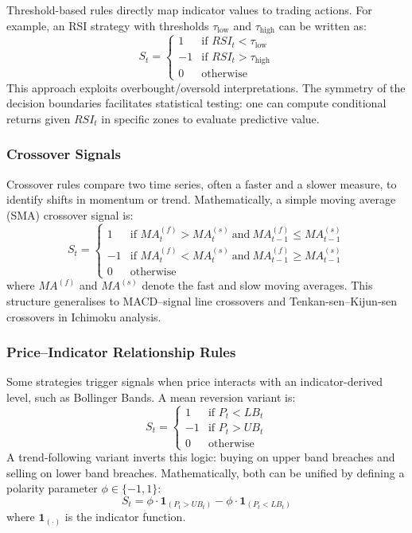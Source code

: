 Threshold-based rules directly map indicator values to trading actions. For example, an RSI strategy with thresholds $\tau_{\text{low}}$ and $\tau_{\text{high}}$ can be written as:
\[
S_t =
\begin{cases}
1 & \text{if } RSI_t < \tau_{\text{low}} \\
-1 & \text{if } RSI_t > \tau_{\text{high}} \\
0 & \text{otherwise}
\end{cases}
\]
This approach exploits overbought/oversold interpretations. The symmetry of the decision boundaries facilitates statistical testing: one can compute conditional returns given $RSI_t$ in specific zones to evaluate predictive value.

\subsubsection{Crossover Signals}

Crossover rules compare two time series, often a faster and a slower measure, to identify shifts in momentum or trend. Mathematically, a simple moving average (SMA) crossover signal is:
\[
S_t =
\begin{cases}
1 & \text{if } MA^{(f)}_t > MA^{(s)}_t \ \text{and} \ MA^{(f)}_{t-1} \le MA^{(s)}_{t-1} \\
-1 & \text{if } MA^{(f)}_t < MA^{(s)}_t \ \text{and} \ MA^{(f)}_{t-1} \ge MA^{(s)}_{t-1} \\
0 & \text{otherwise}
\end{cases}
\]
where $MA^{(f)}$ and $MA^{(s)}$ denote the fast and slow moving averages. This structure generalises to MACD–signal line crossovers and Tenkan-sen–Kijun-sen crossovers in Ichimoku analysis.

\subsubsection{Price–Indicator Relationship Rules}

Some strategies trigger signals when price interacts with an indicator-derived level, such as Bollinger Bands. A mean reversion variant is:
\[
S_t =
\begin{cases}
1 & \text{if } P_t < LB_t \\
-1 & \text{if } P_t > UB_t \\
0 & \text{otherwise}
\end{cases}
\]
A trend-following variant inverts this logic: buying on upper band breaches and selling on lower band breaches. Mathematically, both can be unified by defining a polarity parameter $\phi \in \{-1, 1\}$:
\[
S_t = \phi \cdot \mathbf{1}_{(P_t > UB_t)} - \phi \cdot \mathbf{1}_{(P_t < LB_t)}
\]
where $\mathbf{1}_{(\cdot)}$ is the indicator function.

